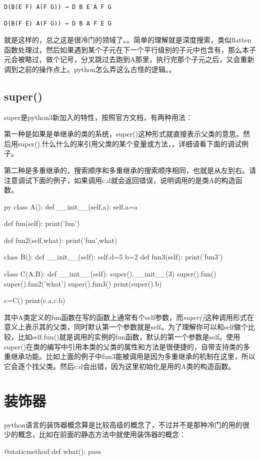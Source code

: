 \documentclass[12pt,oneside]{book}
\begin{document}
\begin{common-format}
\begin{Verbatim}
D(B(E F) A(F G)) → D B E A F G

D(B(F E) A(F G)) → D B A F E G
\end{Verbatim}
就是这样的，总之这是很冷门的领域了。。简单的理解就是深度搜索，类似flatten函数处理过，然后如果遇到某个子元在下一个平行级别的子元中也含有，那么本子元会被略过，做个记号，分叉跳过去跑到A那里，执行完那个子元之后，又会重新调到之前的操作点上。python怎么弄这么古怪的逻辑。。



\subsection{super()}
super是python3新加入的特性，按照官方文档，有两种用法：

第一种是如果是单继承的类的系统，super()这种形式就直接表示父类的意思。然后用super().什么什么的来引用父类的某个变量或方法，，详细请看下面的调试例子。

第二种是多重继承的，搜索顺序和多重继承的搜索顺序相同，也就是从左到右。请注意调试下面的例子，如果调用c.d就会返回错误，说明调用的是类A的构造函数。

\begin{xverbatim}[129]{py}
class A():
    def __init__(self,a):
        self.a=a

    def fun(self):
        print('fun')

    def fun2(self,what):
        print('fun',what)

class B():
    def __init__(self):
        self.d=5
    b=2
    def fun3(self):
        print('fun3')

class C(A,B):
    def __init__(self):
        super().__init__(3)
        super().fun()
        super().fun2('what')
        super().fun3()
        print(super().b)

c=C()
print(c.a,c.b)
\end{xverbatim}

其中A类定义的fun函数在写的函数上通常有个self参数，而\emph{super()}这种调用形式在意义上表示其的父类，同时默认第一个参数就是self。为了理解你可以和self做个比较，比如self.fun()就是调用的实例的fun函数，默认的第一个参数是self。使用super()在类的编写中引用本类的父类的属性和方法是很便捷的，自带支持类的多重继承功能。比如上面的例子中fun3能被调用是因为多重继承的机制在这里，所以它会逐个找父类。然后c.d会出错，因为这里初始化是用的A类的构造函数。


\section{装饰器}
python语言的装饰器概念算是比较高级的概念了，不过并不是那种冷门的用的很少的概念，比如在前面的静态方法中就使用装饰器的概念：
\begin{tcbpython}[]
    @staticmethod
    def what():
        pass
\end{tcbpython}



\end{common-format}
\end{document}
